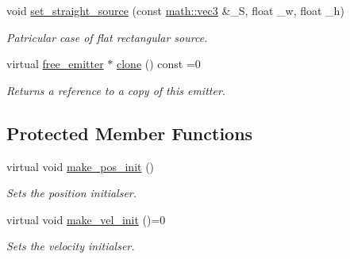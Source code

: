 \begin{DoxyCompactItemize}
void \hyperlink{classphysim_1_1emitters_1_1free__emitters_1_1rect__source_a815c63a97fe9fd5defe9110666e4c794}{set\+\_\+straight\+\_\+source} (const \hyperlink{structphysim_1_1math_1_1vec3}{math\+::vec3} \&\+\_\+S, float \+\_\+w, float \+\_\+h)
\begin{DoxyCompactList}\small\item\em Patricular case of flat rectangular source. \end{DoxyCompactList}\item 
\mbox{\label{classphysim_1_1emitters_1_1free__emitters_1_1rect__source_a629b14b434936e5dfd1f82ac6e7853a8}} 
virtual \hyperlink{classphysim_1_1emitters_1_1free__emitter}{free\+\_\+emitter} $\ast$ \hyperlink{classphysim_1_1emitters_1_1free__emitters_1_1rect__source_a629b14b434936e5dfd1f82ac6e7853a8}{clone} () const =0
\begin{DoxyCompactList}\small\item\em Returns a reference to a copy of this emitter. \end{DoxyCompactList}\end{DoxyCompactItemize}
\subsection*{Protected Member Functions}
\begin{DoxyCompactItemize}
\item 
virtual void \hyperlink{classphysim_1_1emitters_1_1free__emitters_1_1rect__source_ab5109666862f8f49e18f06d9bf663901}{make\+\_\+pos\+\_\+init} ()
\begin{DoxyCompactList}\small\item\em Sets the position initialser. \end{DoxyCompactList}\item 
virtual void \hyperlink{classphysim_1_1emitters_1_1free__emitters_1_1rect__source_aace4d8f596f2a138e098ab0f86e927b5}{make\+\_\+vel\+\_\+init} ()=0
\begin{DoxyCompactList}\small\item\em Sets the velocity initialser. \end{DoxyCompactList}\end{DoxyCompactItemize}

